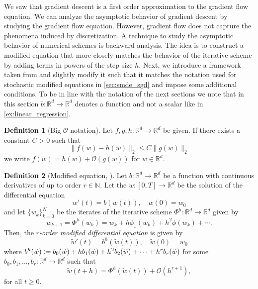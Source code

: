 \documentclass[12pt]{article}
\theoremstyle{definition}
\newtheorem{definition}[definition]{Definition}
\numberwithin{equation}{section}
\newcommand{\N}{\mathbb{N}}
\newcommand{\R}{\mathbb{R}}
\newcommand{\CO}{\mathcal{O}}
\newcommand{\norm}[1]{\lVert{#1}\rVert_2}
\newcommand{\defeq}{\vcentcolon=}
\begin{document}
We saw that gradient descent is a first order approximation to the gradient flow equation. We can analyze the asymptotic behavior of gradient descent by studying the gradient flow equation. However, gradient flow does not capture the phenomena induced by discretization. 
A technique to study the asymptotic behavior of numerical schemes is backward analysis. The idea is to construct a modified equation that more closely matches the behavior of the iterative scheme by adding terms in powers of the step size $h$.
Next, we introduce a framework taken from \cite{hairerGeometricNumericalIntegration2013} and slightly modify it such that it matches the notation used for stochastic modified equations in \autoref{sec:smde_sgd} and impose some additional conditions. To be in line with the notation of the next sections we note that in this section  $b : \R^d \rightarrow \R^d$ denotes a function and not a scalar like in \autoref{ex:linear_regression}.
\begin{definition}[Big $\CO$ notation]
  Let $f,g,h: \R^d \rightarrow \R^d$ be given. If there exists a constant $C > 0$ such that
  \begin{equation*}
    \norm{f(w) - h(w)} \leq C \norm{g(w)}
  \end{equation*}
  we write $f(w) = h(w) + \CO(g(w))$ for $w \in \R^d$.
\end{definition}
\begin{definition}[Modified equation, ]
  Let $b: \R^d \rightarrow \R^d$ be a function with continuous derivatives of up to order $r \in \N$. Let the $w:[0,T] \rightarrow \R^d$ be the solution of the differential equation
  \begin{equation*}
    w'(t) = b(w(t)), \quad w(0) = w_0
  \end{equation*}
  and let $\{w_k\}_{k=0}^N$ be the iterates of the iterative scheme $\Phi^h : \R^d \rightarrow \R^d$ given by
  \begin{equation*}
    w_{k+1} = \Phi^h(w_k) = w_k + h \phi_1(w_k) + h^2 \phi(w_k) + \cdots.
  \end{equation*}
  Then, the \emph{$r$-order modified differential equation} is given by
  \begin{equation*}
    \widetilde{w}'(t) = b^h(\widetilde{w}(t)), \quad \widetilde{w}(0) = w_0
  \end{equation*}
  where $b^h(\widetilde{w}) \defeq b_0(\widetilde{w}) + hb_1(\widetilde{w}) + h^2b_2(\widetilde{w})+\cdots + h^rb_r(\widetilde{w})$
  for some $b_0, b_1, \dots, b_r : \R^d \rightarrow \R^d$ such that 
  \begin{equation*}
    \widetilde{w}(t+h) = \Phi^h(\widetilde{w}(t)) + \CO(h^{r+1}),
  \end{equation*}
  for all $t \geq 0$.
\end{definition}
\end{document}
